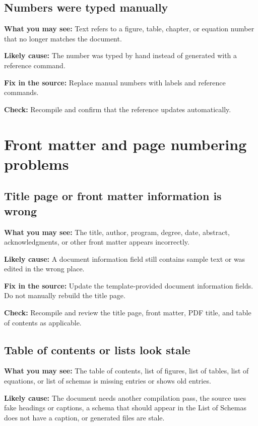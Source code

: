 \subsection{Numbers were typed manually}
\label{subsec:numbers-typed-manually}

\textbf{What you may see:} Text refers to a figure, table, chapter, or equation number that no longer matches the document.

\textbf{Likely cause:} The number was typed by hand instead of generated with a reference command.

\textbf{Fix in the source:} Replace manual numbers with labels and reference commands.

\textbf{Check:} Recompile and confirm that the reference updates automatically.

\section{Front matter and page numbering problems}
\label{sec:front-matter-page-numbering-problems}

\subsection{Title page or front matter information is wrong}
\label{subsec:title-page-information-wrong}

\textbf{What you may see:} The title, author, program, degree, date, abstract, acknowledgments, or other front matter appears incorrectly.

\textbf{Likely cause:} A document information field still contains sample text or was edited in the wrong place.

\textbf{Fix in the source:} Update the template-provided document information fields. Do not manually rebuild the title page.

\textbf{Check:} Recompile and review the title page, front matter, PDF title, and table of contents as applicable.

\subsection{Table of contents or lists look stale}
\label{subsec:toc-lists-stale}

\textbf{What you may see:} The table of contents, list of figures, list of tables, list of equations, or list of schemas is missing entries or shows old entries.

\textbf{Likely cause:} The document needs another compilation pass, the source uses fake headings or captions, a schema that should appear in the List of Schemas does not have a caption, or generated files are stale.

